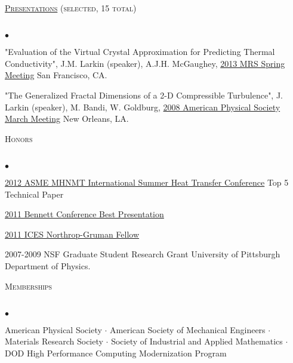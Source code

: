 \documentclass{article}
\newcommand{\lineunder}{\vspace*{-8pt} \\ \hspace*{-18pt} \hrulefill \\}
\newcommand{\header}[1]{{\hspace*{-15pt}\vspace*{6pt} \textsc{#1}} \vspace*{-6pt} \lineunder}
\newenvironment{achievements}{\begin{list}{$\bullet$}{\topsep 0pt \itemsep -2pt}}{\vspace*{4pt}\end{list}}
\begin{document}
\header{\href{http://jasonlarkin.github.io/pres.html}{Presentations} (selected, 15 total)}
\begin{achievements}
\item "Evaluation of the Virtual Crystal Approximation for Predicting Thermal Conductivity", J.M. Larkin (speaker), A.J.H.
   McGaughey, \href{http://www.mrs.org/spring2013/}{2013 MRS Spring Meeting} San Francisco, CA.
\item "The Generalized Fractal Dimensions of a 2-D Compressible Turbulence", J. Larkin (speaker), M. Bandi, W. Goldburg, \href{http://meetings.aps.org/Meeting/MAR08/Content/1017}{2008 American Physical Society March Meeting} New Orleans, LA.
\end{achievements}


\header{Honors}
\begin{achievements}
\item \href{http://www.asmeconferences.org/HT2012/}{2012 ASME MHNMT International Summer Heat Transfer Conference} Top 5 Technical Paper
\item \href{http://www.cmu.edu/me/news/archive/2011/bennett-conference.html}{2011 Bennett Conference Best Presentation}
\item \href{http://www.ices.cmu.edu/newsitem.asp?NewsID=749}{2011 ICES Northrop-Gruman Fellow}
\item 2007-2009 NSF Graduate Student Research Grant University of Pittsburgh Department of Physics.
\end{achievements}

\header{Memberships}
\begin{achievements}
\item American Physical Society $\cdot$ American Society of Mechanical Engineers 
$\cdot$ Materials Research Society $\cdot$ Society of Industrial and Applied Mathematics $\cdot$ DOD High Performance Computing Modernization Program
\end{achievements}
\end{document}
